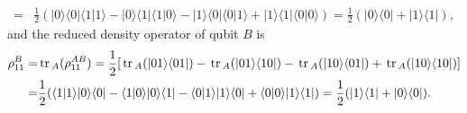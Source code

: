\documentclass[en]{sol-man}
\begin{document}
\begin{sol}
\begin{align}
        =&\frac{1}{2}(\lvert 0\rangle\langle 0\rvert\langle 1\vert 1\rangle-\lvert 0\rangle\langle 1\rvert\langle 1\vert 0\rangle-\lvert 1\rangle\langle 0\rvert\langle 0\vert 1\rangle+\lvert 1\rangle\langle 1\rvert\langle 0\vert 0\rangle)=\frac{1}{2}(\lvert 0\rangle\langle 0\rvert+\lvert 1\rangle\langle 1\rvert),
    \end{align}
    and the reduced density operator of qubit $B$ is
    \begin{align}
        \notag\rho_{11}^B=&\,\mathrm{tr}\,_A(\rho_{11}^{AB})=\frac{1}{2}[\,\mathrm{tr}\,_A(\lvert 01\rangle\langle 01\rvert)-\,\mathrm{tr}\,_A(\lvert 01\rangle\langle 10\rvert)-\,\mathrm{tr}\,_A(\lvert 10\rangle\langle 01\rvert)+\,\mathrm{tr}\,_A(\lvert 10\rangle\langle 10\rvert)]\\
        =&\frac{1}{2}(\langle 1\vert 1\rangle\lvert 0\rangle\langle 0\rvert-\langle 1\vert 0\rangle\lvert 0\rangle\langle 1\rvert-\langle 0\vert 1\rangle\lvert 1\rangle\langle 0\rvert+\langle 0\vert 0\rangle\lvert 1\rangle\langle 1\rvert)=\frac{1}{2}(\lvert 1\rangle\langle 1\rvert+\lvert 0\rangle\langle 0\rvert).
    \end{align}
\end{sol}
\end{document}
